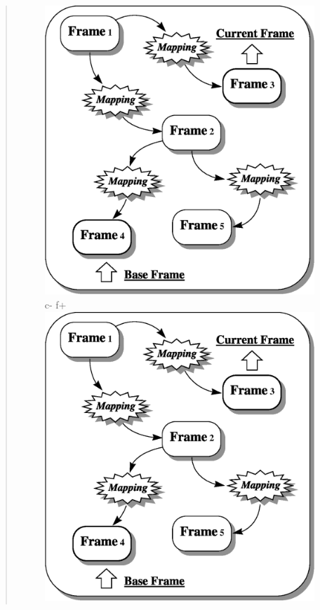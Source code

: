 \documentclass[twoside,11pt]{article}
\begin{document}
{\begin{htmlonly}
\begin{quote}
\begin{figure}
   \includegraphics[scale=1.0]{sun211_figures/frameset.eps}
c-
f+
   \includegraphics[scale=1.0]{sun210_figures/frameset.eps}

\end{figure}
\end{quote}
\end{htmlonly}}
\end{document}
